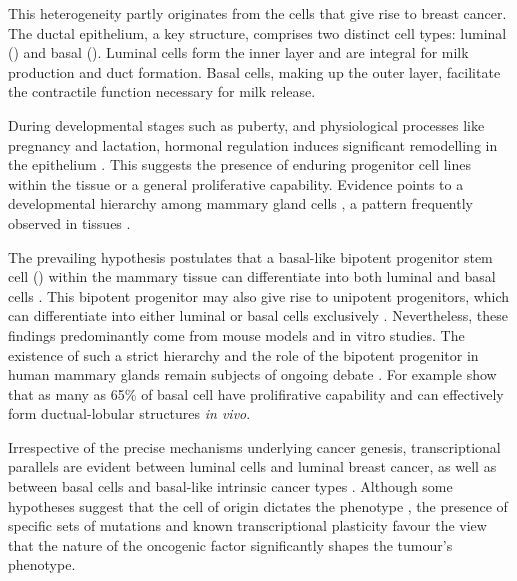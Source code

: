 This heterogeneity partly originates from the cells that give rise to breast cancer. The ductal epithelium, a key structure, comprises two distinct cell types: luminal () and basal (). Luminal cells form the inner layer and are integral for milk production and duct formation. Basal cells, making up the outer layer, facilitate the contractile function necessary for milk release.

During developmental stages such as puberty, and physiological processes like pregnancy and lactation, hormonal regulation induces significant remodelling in the epithelium \parencite{Macias2012-su}. This suggests the presence of enduring progenitor cell lines within the tissue or a general proliferative capability. Evidence points to a developmental hierarchy among mammary gland cells \parencite{Skibinski2015-rh}, a pattern frequently observed in tissues .

The prevailing hypothesis postulates that a basal-like bipotent progenitor stem cell () within the mammary tissue can differentiate into both luminal and basal cells \parencite{Stingl2001-cb,Prater2014-qd,Rios2014-jj}. This bipotent progenitor may also give rise to unipotent progenitors, which can differentiate into either luminal or basal cells exclusively \parencite{Van_Keymeulen2011-um,Rios2014-jj,Tao2014-ol}. Nevertheless, these findings predominantly come from mouse models and in vitro studies. The existence of such a strict hierarchy and the role of the bipotent progenitor in human mammary glands remain subjects of ongoing debate \parencite{Skibinski2015-rh}. For example \textcite{Prater2014-qd} show that as many as 65\% of basal cell have prolifirative capability and can effectively form ductual-lobular structures \emph{in vivo}.  

Irrespective of the precise mechanisms underlying cancer genesis, transcriptional parallels are evident between luminal cells and luminal breast cancer, as well as between basal cells and basal-like intrinsic cancer types \parencite{Bhat-Nakshatri2021-jy}. Although some hypotheses suggest that the cell of origin dictates the phenotype \parencite{Skibinski2015-rh, Taurin2020-mq}, the presence of specific sets of mutations \parencite{Cancer_Genome_Atlas_Network2012-gx,Russnes2017-eo} and known transcriptional plasticity \parencite{Fan2020-vi, Su2015-ve,Yamamoto2014-th} favour the view that the nature of the oncogenic factor significantly shapes the tumour's phenotype.

